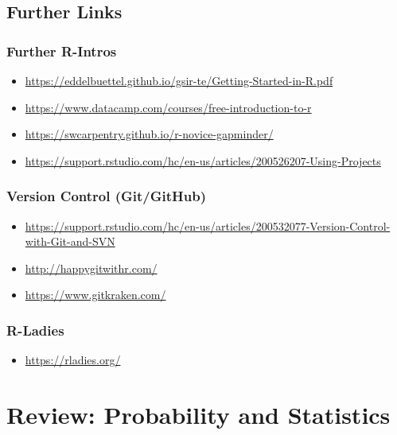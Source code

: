 \documentclass[
  14pt,
]{memoir}
\providecommand{\tightlist}{%
  \setlength{\itemsep}{0pt}\setlength{\parskip}{0pt}}
\begin{document}
\hypertarget{further-links}{%
\section{Further Links}\label{further-links}}

\hypertarget{further-r-intros}{%
\subsection{Further R-Intros}\label{further-r-intros}}

\begin{itemize}
\item
  \url{https://eddelbuettel.github.io/gsir-te/Getting-Started-in-R.pdf}
\item
  \url{https://www.datacamp.com/courses/free-introduction-to-r}
\item
  \url{https://swcarpentry.github.io/r-novice-gapminder/}
\item
  \url{https://support.rstudio.com/hc/en-us/articles/200526207-Using-Projects}
\end{itemize}

\hypertarget{version-control-gitgithub}{%
\subsection{Version Control (Git/GitHub)}\label{version-control-gitgithub}}

\begin{itemize}
\item
  \url{https://support.rstudio.com/hc/en-us/articles/200532077-Version-Control-with-Git-and-SVN}
\item
  \url{http://happygitwithr.com/}
\item
  \url{https://www.gitkraken.com/}
\end{itemize}

\hypertarget{r-ladies}{%
\subsection{R-Ladies}\label{r-ladies}}

\begin{itemize}
\tightlist
\item
  \url{https://rladies.org/}
\end{itemize}

\hypertarget{ReviewStats}{%
\chapter{Review: Probability and Statistics}\label{ReviewStats}}
\end{document}
